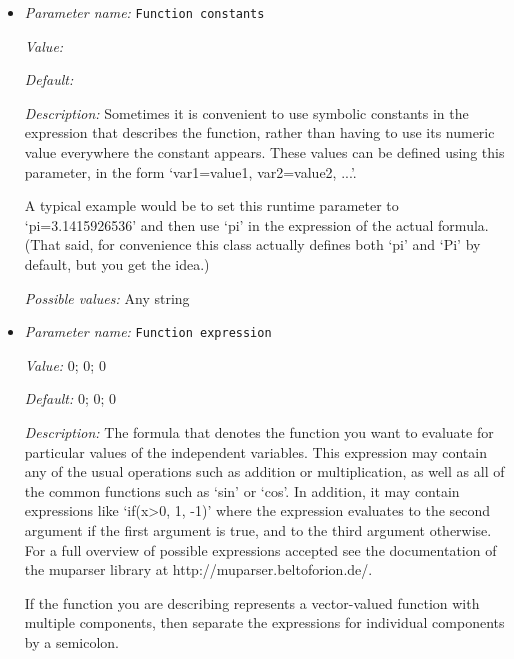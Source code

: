 \begin{itemize}
\item {\it Parameter name:} {\tt Function constants}
\label{parameters:Prescribed Stokes solution/Fluid velocity function/Function constants}
\label{parameters:Prescribed_20Stokes_20solution/Fluid_20velocity_20function/Function_20constants}


{\it Value:} 


{\it Default:} 


{\it Description:} Sometimes it is convenient to use symbolic constants in the expression that describes the function, rather than having to use its numeric value everywhere the constant appears. These values can be defined using this parameter, in the form `var1=value1, var2=value2, ...'.

A typical example would be to set this runtime parameter to `pi=3.1415926536' and then use `pi' in the expression of the actual formula. (That said, for convenience this class actually defines both `pi' and `Pi' by default, but you get the idea.)


{\it Possible values:} Any string
\item {\it Parameter name:} {\tt Function expression}
\label{parameters:Prescribed Stokes solution/Fluid velocity function/Function expression}
\label{parameters:Prescribed_20Stokes_20solution/Fluid_20velocity_20function/Function_20expression}


{\it Value:} 0; 0; 0


{\it Default:} 0; 0; 0


{\it Description:} The formula that denotes the function you want to evaluate for particular values of the independent variables. This expression may contain any of the usual operations such as addition or multiplication, as well as all of the common functions such as `sin' or `cos'. In addition, it may contain expressions like `if(x>0, 1, -1)' where the expression evaluates to the second argument if the first argument is true, and to the third argument otherwise. For a full overview of possible expressions accepted see the documentation of the muparser library at http://muparser.beltoforion.de/.

If the function you are describing represents a vector-valued function with multiple components, then separate the expressions for individual components by a semicolon.



\end{itemize}
